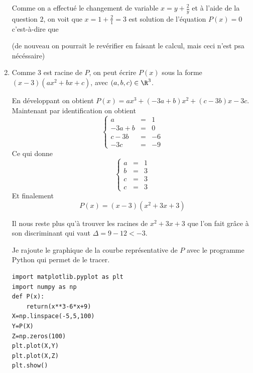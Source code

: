 \begin{correction}
\begin{enumerate}
Comme  on a effectué le changement de variable  $x=y+\frac{2}{y}$ et à l'aide de la question $2$, on voit que $x=1+\frac{2}{1}=3$ est solution de l'équation $P(x)=0$ c'est-à-dire que 

(de nouveau on pourrait le revérifier en faisant le calcul, mais ceci n'est psa nécéssaire)

\item Comme $3$ est racine de $P$, on peut écrire $P(x)$ sous la forme $(x-3)(ax^2+bx+c)$, avec $(a,b,c)\in \R^3$. 

En développant on obtient 
$P(x)= ax^3 +(-3a+b)x^2+(c-3b)x-3c.$ Maintenant par identification on obtient 
$$\left\{\begin{array}{ccc}
a&=&1\\
-3a+b&=&0\\
c-3b&=&-6\\
-3c&=&-9
\end{array}\right.$$
Ce qui donne 
$$\left\{\begin{array}{ccc}
a&=&1\\
b&=&3\\
c&=&3\\
c&=&3
\end{array}\right.$$
Et finalement 
$$P(x) = (x-3) (x^2+3x+3)$$

Il nous reste plus qu'à trouver les racines de $x^2+3x+3$ que l'on fait grâce à son discriminant qui vaut $\Delta =9-12<-3$. 



Je rajoute le graphique de la courbe représentative de $P$ avec le programme Python qui permet de le tracer. 
\begin{lstlisting}
import matplotlib.pyplot as plt
import numpy as np
def P(x):
    return(x**3-6*x+9)
X=np.linspace(-5,5,100)
Y=P(X)
Z=np.zeros(100)
plt.plot(X,Y)
plt.plot(X,Z)
plt.show()
\end{lstlisting}

 
\end{enumerate}

\end{correction}









